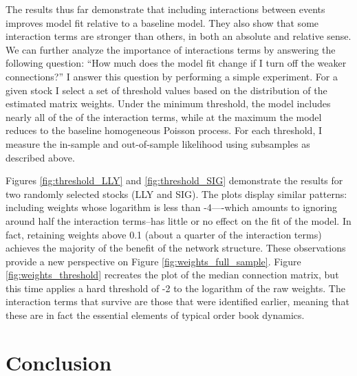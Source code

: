 The results thus far demonstrate that including interactions between events improves model fit relative to a baseline model. They also show that some interaction terms are stronger than others, in both an absolute and relative sense. We can further analyze the importance of interactions terms by answering the following question: “How much does the model fit change if I turn off the weaker connections?” I answer this question by performing a simple experiment. For a given stock I select a set of threshold values based on the distribution of the estimated matrix weights. Under the minimum threshold, the model includes nearly all of the of the interaction terms, while at the maximum the model reduces to the baseline homogeneous Poisson process. For each threshold, I measure the in-sample and out-of-sample likelihood using subsamples as described above.

Figures \ref{fig:threshold_LLY} and \ref{fig:threshold_SIG} demonstrate the results for two randomly selected stocks (LLY and SIG). The plots display similar patterns: including weights whose logarithm is less than -4—-which amounts to ignoring around half the interaction terms--has little or no effect on the fit of the model. In fact, retaining weights above 0.1 (about a quarter of the interaction terms) achieves the majority of the benefit of the network structure. These observations provide a new perspective on Figure \ref{fig:weights_full_sample}. Figure \ref{fig:weights_threshold} recreates the plot of the median connection matrix, but this time applies a hard threshold of -2 to the logarithm of the raw weights. The interaction terms that survive are those that were identified earlier, meaning that these are in fact the essential elements of typical order book dynamics.


\section{Conclusion}



